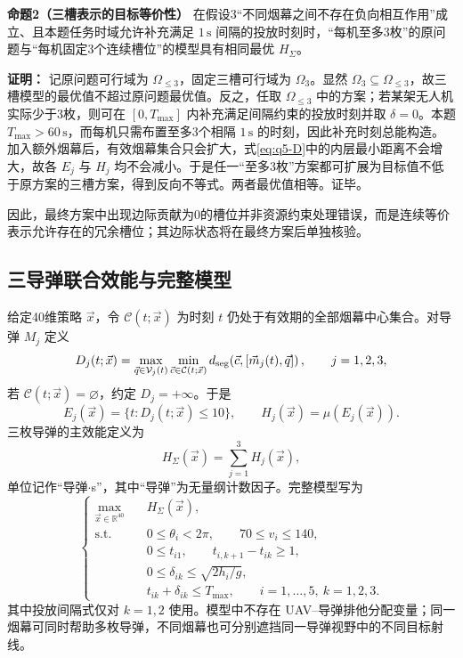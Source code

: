 \begin{propositionbox}
\textbf{命题2（三槽表示的目标等价性）}\quad
在假设3“不同烟幕之间不存在负向相互作用”成立、且本题任务时域允许补充满足 $1\,\mathrm s$ 间隔的投放时刻时，“每机至多3枚”的原问题与“每机固定3个连续槽位”的模型具有相同最优 $H_\Sigma$。

\textbf{证明：}
记原问题可行域为 $\Omega_{\le3}$，固定三槽可行域为 $\Omega_3$。显然 $\Omega_3\subseteq\Omega_{\le3}$，故三槽模型的最优值不超过原问题最优值。反之，任取 $\Omega_{\le3}$ 中的方案；若某架无人机实际少于3枚，则可在 $[0,T_{\max}]$ 内补充满足间隔约束的投放时刻并取 $\delta=0$。本题 $T_{\max}>60\,\mathrm s$，而每机只需布置至多3个相隔 $1\,\mathrm s$ 的时刻，因此补充时刻总能构造。加入额外烟幕后，有效烟幕集合只会扩大，式\eqref{eq:q5-D}中的内层最小距离不会增大，故各 $E_j$ 与 $H_j$ 均不会减小。于是任一“至多3枚”方案都可扩展为目标值不低于原方案的三槽方案，得到反向不等式。两者最优值相等。证毕。\proofend
\end{propositionbox}

因此，最终方案中出现边际贡献为0的槽位并非资源约束处理错误，而是连续等价表示允许存在的冗余槽位；其边际状态将在最终方案后单独核验。

\subsection{三导弹联合效能与完整模型}
给定40维策略 $\vec x$，令 $\mathcal C(t;\vec x)$ 为时刻 $t$ 仍处于有效期的全部烟幕中心集合。对导弹 $M_j$ 定义
\begin{equation}
D_j(t;\vec x)=
\max_{\vec q\in\mathcal V_j(t)}
\min_{\vec c\in\mathcal C(t;\vec x)}
 d_{\rm seg}\!\left(\vec c,[\vec m_j(t),\vec q]\right),
\qquad j=1,2,3,
\label{eq:q5-D}
\end{equation}
若 $\mathcal C(t;\vec x)=\varnothing$，约定 $D_j=+\infty$。于是
\begin{equation}
E_j(\vec x)=\{t:D_j(t;\vec x)\le10\},
\qquad
H_j(\vec x)=\mu(E_j(\vec x)).
\label{eq:q5-Hj}
\end{equation}
三枚导弹的主效能定义为
\begin{equation}
H_\Sigma(\vec x)=\sum_{j=1}^{3}H_j(\vec x),
\label{eq:q5-sum}
\end{equation}
单位记作“导弹$\cdot$s”，其中“导弹”为无量纲计数因子。完整模型写为
\begin{equation}
\left\{
\begin{aligned}
\max_{\vec x\in\mathbb R^{40}}\quad &H_\Sigma(\vec x),\\
\text{s.t.}\quad
&0\le\theta_i<2\pi,\qquad 70\le v_i\le140,\\
&0\le t_{i1},\qquad t_{i,k+1}-t_{ik}\ge1,\\
&0\le\delta_{ik}\le\sqrt{2h_i/g},\\
&t_{ik}+\delta_{ik}\le T_{\max},
\qquad i=1,\ldots,5,\ k=1,2,3.
\end{aligned}
\right.
\label{eq:q5-model}
\end{equation}
其中投放间隔式仅对 $k=1,2$ 使用。模型中不存在 UAV--导弹排他分配变量；同一烟幕可同时帮助多枚导弹，不同烟幕也可分别遮挡同一导弹视野中的不同目标射线。

